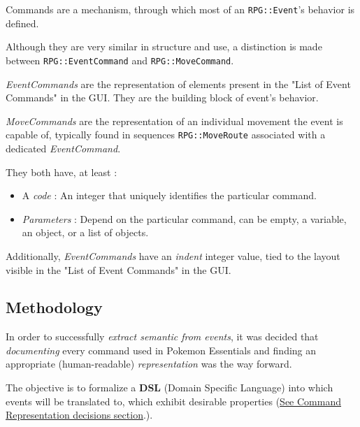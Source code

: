 \documentclass[11pt]{article}
\begin{document}
Commands are a mechanism, through which most of an \verb|RPG::Event|'s behavior is defined.

Although they are very similar in structure and use, a distinction is made between \verb|RPG::EventCommand| and \verb|RPG::MoveCommand|.

\textit{EventCommands} are the representation of elements present in the "List of Event Commands" in the GUI. They are the building block of event's behavior.

\textit{MoveCommands} are the representation of an individual movement the event is capable of, typically found in sequences \verb|RPG::MoveRoute| associated with a dedicated \textit{EventCommand}.

They both have, at least :
\begin{itemize}
	\item A \textit{code} : An integer that uniquely identifies the particular command.
	\item \textit{Parameters} : Depend on the particular command, can be empty, a variable, an object, or a list of objects.
\end{itemize}

Additionally, \textit{EventCommands} have an \textit{indent} integer value, tied to the layout visible in the "List of Event Commands" in the GUI.


\subsection{Methodology}

In order to successfully \textit{extract semantic from events}, it was decided that \textit{documenting} every command used in Pokemon Essentials and finding an appropriate (human-readable) \textit{representation} was the way forward.

The objective is to formalize a \textbf{DSL} (Domain Specific Language) into which events will be translated to, which exhibit desirable properties (\hyperref[sec:cmdrepr]{See Command Representation decisions section}.).


\end{document}
